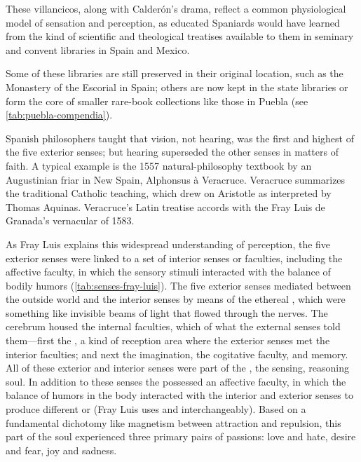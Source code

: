 These villancicos, along with Calderón's drama, reflect a common physiological
model of sensation and perception, as educated Spaniards would have learned
from the kind of scientific and theological treatises available to them in
seminary and convent libraries in Spain and Mexico.%
\begin{Footnote}
    Some of these libraries are still preserved in their original location, such
    as the Monastery of the Escorial in Spain; others are now kept in the state
    libraries or form the core of smaller rare-book collections like those in
    Puebla (see \cref{tab:puebla-compendia}).
\end{Footnote}
Spanish philosophers taught that vision, not hearing, was the first and highest
of the five exterior senses; but hearing superseded the other senses in matters
of faith.
A typical example is the 1557 natural-philosophy textbook  by an Augustinian friar in New Spain, Alphonsus à Veracruce.%
    \Autocite{Veracruce:Phisica}
Veracruce summarizes the traditional Catholic teaching, which drew on Aristotle
as interpreted by Thomas Aquinas.
Veracruce's Latin treatise accords with the Fray Luis de Granada's
vernacular  of 1583.%
    \Autocites{LuisdeGranada:Simbolo}{LuisdeGranada-Balcells:SimboloPtI}

As Fray Luis explains this widespread understanding of perception, the five
exterior senses were linked to a set of interior senses or faculties, including
the affective faculty, in which the sensory stimuli interacted with the balance
of bodily humors (\cref{tab:senses-fray-luis}).%
    \Autocite
    [, ]
    {LuisdeGranada-Balcells:SimboloPtI}
The five exterior senses mediated between the outside world and the interior
senses by means of the ethereal , which were something
like invisible beams of light that flowed through the nerves.  
The cerebrum housed the internal faculties, which  of what
the external senses told them---first the , a kind of
reception area where the exterior senses met the interior faculties; and next
the imagination, the cogitative faculty, and memory.
All of these exterior and interior senses were part of the , the sensing, reasoning soul.
In addition to these senses the  possessed an affective
faculty, in which the balance of humors in the body interacted with the interior
and exterior senses to produce different  or 
(Fray Luis uses  and  interchangeably).
Based on a fundamental dichotomy like magnetism between attraction and
repulsion, this  part of the soul experienced three
primary pairs of passions: love and hate, desire and fear, joy and sadness.


